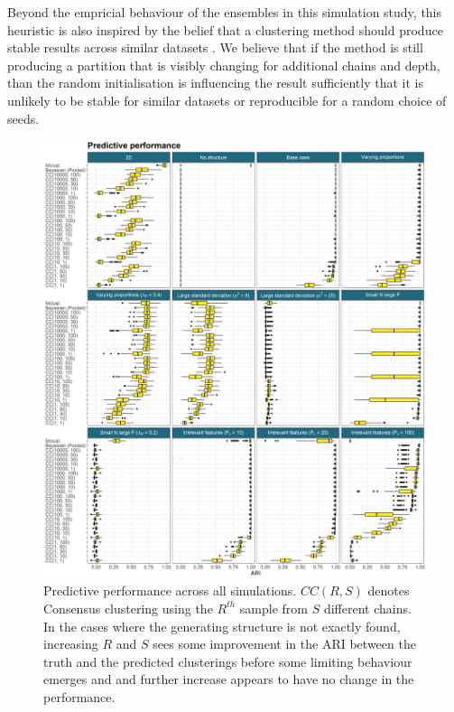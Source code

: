 \documentclass[]{article}
\begin{document}
Beyond the empricial behaviour of the ensembles in this simulation study, this heuristic is also inspired by the belief that a clustering method should produce stable results across similar datasets \citep{von2005towards, meinshausen2010stability}. We believe that if the method is still producing a partition that is visibly changing for additional chains and depth, than the random initialisation is influencing the result sufficiently that it is unlikely to be stable for similar datasets or reproducible for a random choice of seeds. %

\begin{figure} %
	\centering
	\includegraphics[scale=0.4]{./Images/Simulations/simulation_model_prediction.png}
	\caption{Predictive performance across all simulations. $CC(R, S)$ denotes Consensus clustering using the $R^{th}$ sample from $S$ different chains. In the cases where the generating structure is not exactly found, increasing $R$ and $S$ sees some improvement in the ARI between the truth and the predicted clusterings before some limiting behaviour emerges and and further increase appears to have no change in the performance.}
	\label{fig:simPrediction}
\end{figure}
\end{document}
